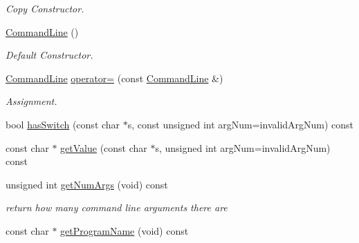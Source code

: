 \begin{DoxyCompactItemize}
\begin{DoxyCompactList}\small\item\em Copy Constructor. \item\end{DoxyCompactList}\item 
\hypertarget{classFramework_1_1CommandLine_ae7e0b85945555ccad2e39dec1f50aa22}{
\hyperlink{classFramework_1_1CommandLine_ae7e0b85945555ccad2e39dec1f50aa22}{CommandLine} ()}
\label{classFramework_1_1CommandLine_ae7e0b85945555ccad2e39dec1f50aa22}

\begin{DoxyCompactList}\small\item\em Default Constructor. \item\end{DoxyCompactList}\item 
\hypertarget{classFramework_1_1CommandLine_aabe65d35ee4f08e6c152b2133d294bed}{
\hyperlink{classFramework_1_1CommandLine}{CommandLine} \hyperlink{classFramework_1_1CommandLine_aabe65d35ee4f08e6c152b2133d294bed}{operator=} (const \hyperlink{classFramework_1_1CommandLine}{CommandLine} \&)}
\label{classFramework_1_1CommandLine_aabe65d35ee4f08e6c152b2133d294bed}

\begin{DoxyCompactList}\small\item\em Assignment. \item\end{DoxyCompactList}\item 
bool \hyperlink{classFramework_1_1CommandLine_af4c67cb238a4604c45ad8871269b8489}{hasSwitch} (const char $\ast$s, const unsigned int argNum=invalidArgNum) const 
\item 
const char $\ast$ \hyperlink{classFramework_1_1CommandLine_abf282e747032e7dd5b0648344f7608b8}{getValue} (const char $\ast$s, unsigned int argNum=invalidArgNum) const 
\item 
\hypertarget{classFramework_1_1CommandLine_af30c4f990a3cfbab2d1996b141bf539e}{
unsigned int \hyperlink{classFramework_1_1CommandLine_af30c4f990a3cfbab2d1996b141bf539e}{getNumArgs} (void) const }
\label{classFramework_1_1CommandLine_af30c4f990a3cfbab2d1996b141bf539e}

\begin{DoxyCompactList}\small\item\em return how many command line arguments there are \item\end{DoxyCompactList}\item 
\hypertarget{classFramework_1_1CommandLine_a43de4d1c1947999e7e5bfc87ae574480}{
const char $\ast$ \hyperlink{classFramework_1_1CommandLine_a43de4d1c1947999e7e5bfc87ae574480}{getProgramName} (void) const }
\label{classFramework_1_1CommandLine_a43de4d1c1947999e7e5bfc87ae574480}


\end{DoxyCompactItemize}
